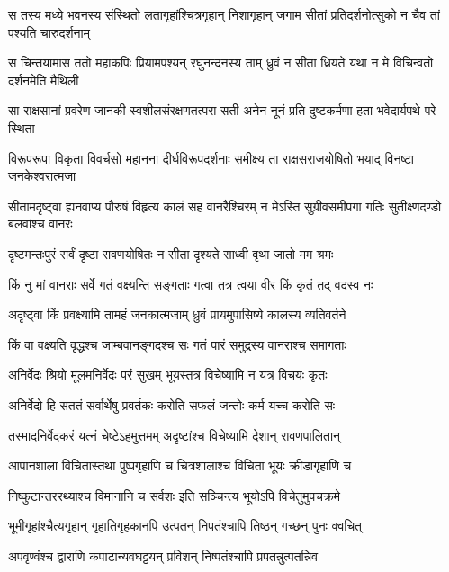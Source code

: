 
\twolineshloka
{स तस्य मध्ये भवनस्य संस्थितो लतागृहांश्चित्रगृहान् निशागृहान्}
{जगाम सीतां प्रतिदर्शनोत्सुको न चैव तां पश्यति चारुदर्शनाम्} %

\twolineshloka
{स चिन्तयामास ततो महाकपिः प्रियामपश्यन् रघुनन्दनस्य ताम्}
{ध्रुवं न सीता ध्रियते यथा न मे विचिन्वतो दर्शनमेति मैथिली} %

\twolineshloka
{सा राक्षसानां प्रवरेण जानकी स्वशीलसंरक्षणतत्परा सती}
{अनेन नूनं प्रति दुष्टकर्मणा हता भवेदार्यपथे परे स्थिता} %

\twolineshloka
{विरूपरूपा विकृता विवर्चसो महानना दीर्घविरूपदर्शनाः}
{समीक्ष्य ता राक्षसराजयोषितो भयाद् विनष्टा जनकेश्वरात्मजा} %

\twolineshloka
{सीतामदृष्ट्वा ह्यनवाप्य पौरुषं विहृत्य कालं सह वानरैश्चिरम्}
{न मेऽस्ति सुग्रीवसमीपगा गतिः सुतीक्ष्णदण्डो बलवांश्च वानरः} %

\twolineshloka
{दृष्टमन्तःपुरं सर्वं दृष्टा रावणयोषितः}
{न सीता दृश्यते साध्वी वृथा जातो मम श्रमः} %

\twolineshloka
{किं नु मां वानराः सर्वे गतं वक्ष्यन्ति सङ्गताः}
{गत्वा तत्र त्वया वीर किं कृतं तद् वदस्व नः} %

\twolineshloka
{अदृष्ट्वा किं प्रवक्ष्यामि तामहं जनकात्मजाम्}
{ध्रुवं प्रायमुपासिष्ये कालस्य व्यतिवर्तने} %

\twolineshloka
{किं वा वक्ष्यति वृद्धश्च जाम्बवानङ्गदश्च सः}
{गतं पारं समुद्रस्य वानराश्च समागताः} %

\twolineshloka
{अनिर्वेदः श्रियो मूलमनिर्वेदः परं सुखम्}
{भूयस्तत्र विचेष्यामि न यत्र विचयः कृतः} %

\twolineshloka
{अनिर्वेदो हि सततं सर्वार्थेषु प्रवर्तकः}
{करोति सफलं जन्तोः कर्म यच्च करोति सः} %

\twolineshloka
{तस्मादनिर्वेदकरं यत्नं चेष्टेऽहमुत्तमम्}
{अदृष्टांश्च विचेष्यामि देशान् रावणपालितान्} %

\twolineshloka
{आपानशाला विचितास्तथा पुष्पगृहाणि च}
{चित्रशालाश्च विचिता भूयः क्रीडागृहाणि च} %

\twolineshloka
{निष्कुटान्तररथ्याश्च विमानानि च सर्वशः}
{इति सञ्चिन्त्य भूयोऽपि विचेतुमुपचक्रमे} %

\twolineshloka
{भूमीगृहांश्चैत्यगृहान् गृहातिगृहकानपि}
{उत्पतन् निपतंश्चापि तिष्ठन् गच्छन् पुनः क्वचित्} %

\twolineshloka
{अपवृण्वंश्च द्वाराणि कपाटान्यवघट्टयन्}
{प्रविशन् निष्पतंश्चापि प्रपतन्नुत्पतन्निव} %


